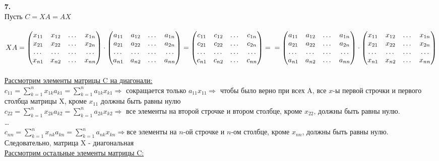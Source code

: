 \documentclass[a4paper]{article}
\newcommand{\mat}[1]{\begin{pmatrix} #1 \end{pmatrix}}
\newcommand{\s}[2]{\sum\limits_{#1}^{#2}}
\renewcommand{\r}{\Rightarrow}
\begin{document}
\begin{enumerate}
    \item[\textbf{7.}]\indent \\
    Пусть $C = XA = AX$\\\\
    $XA = \mat{x_{11} & x_{12} & \dots & x_{1n} \\ x_{21} & x_{22} & \dots & x_{2n} \\ \dots & \dots & \dots & \dots \\ x_{n1} & x_{n2} & \dots & x_{nn}} \cdot \mat{a_{11} & a_{12} & \dots & a_{1n} \\ a_{21} & a_{22} & \dots & a_{2n} \\ \dots & \dots & \dots & \dots \\ a_{n1} & a_{n2} & \dots & a_{nn}} = \mat{c_{11} & c_{12} & \dots & c_{1n} \\ c_{21} & c_{22} & \dots & c_{2n} \\ \dots & \dots & \dots & \dots \\ c_{n1} & c_{n2} & \dots & c_{nn}}= \\
    =\mat{a_{11} & a_{12} & \dots & a_{1n} \\ a_{21} & a_{22} & \dots & a_{2n} \\ \dots & \dots & \dots & \dots \\ a_{n1} & a_{n2} & \dots & a_{nn}} \cdot \mat{x_{11} & x_{12} & \dots & x_{1n} \\ x_{21} & x_{22} & \dots & x_{2n} \\ \dots & \dots & \dots & \dots \\ x_{n1} & x_{n2} & \dots & x_{nn}}$\\\\
    \underline{Рассмотрим элементы матрицы C на диагонали:}\\
    $c_{11} = \s{k=1}{n}x_{1k}a_{k1} = \s{k=1}{n}a_{1k}x_{k1} \r $ сокращается только $a_{11}x_{11} \r$ чтобы было верно при всех A, все $x$-ы первой строчки и первого столбца матрицы X, кроме $x_{11}$ должны быть равны нулю\\
    $c_{22}= \s{k=1}{n}x_{2k}a_{k2} = \s{k=1}{n}a_{2k}x_{k2} \r $ все элементы на второй строчке и втором столбце, кроме $x_{22}$, должны быть равны нулю.\\
    \dots\\
    $c_{nn}= \s{k=1}{n}x_{nk}a_{kn} = \s{k=1}{n}a_{nk}x_{kn} \r $все элементы на $n$-ой строчке и $n$-ом столбце, кроме $x_{nn}$, должны быть равны нулю.\\
    Следовательно, матрица X - диагональная\\
    \underline{Рассмотрим остальные элементы матрицы C:}\\

\end{enumerate}
\end{document}
